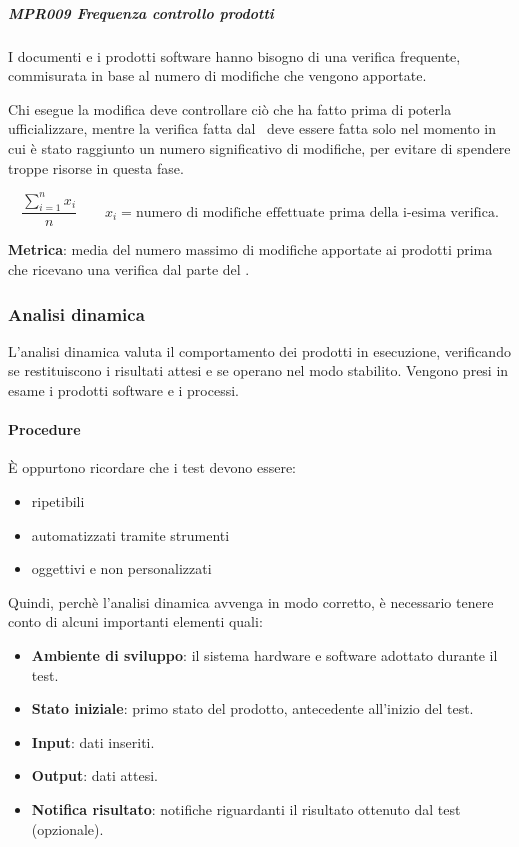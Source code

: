 			\subparagraph{MPR009 Frequenza controllo prodotti}
			I documenti e i prodotti software hanno bisogno di una verifica frequente, commisurata in base al numero di modifiche che vengono apportate.
		
			Chi esegue la modifica deve controllare ciò che ha fatto prima di poterla ufficializzare, mentre la verifica fatta dal \Ver\ deve essere
			fatta solo nel momento in cui è stato raggiunto un numero significativo di modifiche, per evitare di spendere troppe risorse in questa fase.
		
			\[\dfrac{\sum_{i=1}^{n} x_i}{n} \qquad x_i=\text{numero di modifiche effettuate prima della i-esima verifica.}\]
		
			\textbf{Metrica}: media del numero massimo di modifiche apportate ai prodotti prima che ricevano una verifica dal parte del \Ver.

		
		
		\subsubsection{Analisi dinamica}\label{AnalisiDinamica} %
		L'analisi dinamica valuta il comportamento dei prodotti in esecuzione, verificando se restituiscono i risultati attesi e se operano nel modo stabilito.
		Vengono presi in esame i prodotti software e i processi.
		
			\paragraph{Procedure} %
			È oppurtono ricordare che i test devono essere:
			\begin{itemize}
				\item ripetibili
				\item automatizzati tramite strumenti 
				\item oggettivi e non personalizzati
			\end{itemize}
		
			Quindi, perchè l'analisi dinamica avvenga in modo corretto, è necessario tenere conto di alcuni importanti elementi quali:
			\begin{itemize}
				\item \textbf{Ambiente di sviluppo}: il sistema hardware e software adottato durante il test.
				\item \textbf{Stato iniziale}: primo stato del prodotto, antecedente all'inizio del test.
				\item \textbf{Input}: dati inseriti.
				\item \textbf{Output}: dati attesi.
				\item \textbf{Notifica risultato}: notifiche riguardanti il risultato ottenuto dal test (opzionale).
			\end{itemize}
		
